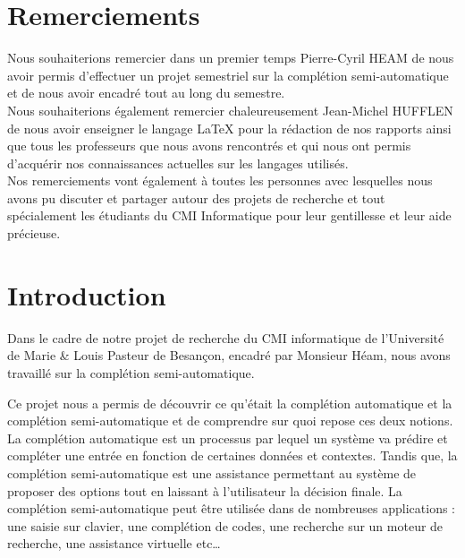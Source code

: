 \documentclass[a4paper, 11pt]{report}
\begin{document}
\chapter*{Remerciements}

Nous souhaiterions remercier dans un premier temps Pierre-Cyril HEAM de nous avoir permis d'effectuer un projet semestriel sur la complétion semi-automatique et de nous avoir encadré tout au long du semestre. \\

Nous souhaiterions également remercier chaleureusement Jean-Michel HUFFLEN de nous avoir enseigner le langage \LaTeX{} pour la rédaction de nos rapports ainsi que tous les professeurs que nous avons rencontrés et qui nous ont permis d'acquérir nos connaissances actuelles sur les langages utilisés.\\

Nos remerciements vont également à toutes les personnes avec lesquelles nous avons pu discuter et partager autour des projets de recherche et tout spécialement les étudiants du CMI Informatique pour leur gentillesse et leur aide précieuse. \\



\newpage
\tableofcontents
\listoffigures



\chapter*{Introduction} %

Dans le cadre de notre projet de recherche du CMI informatique de l’Université de Marie \& Louis Pasteur de Besançon, encadré par Monsieur Héam, nous avons travaillé sur la complétion semi-automatique.\par \vspace{\baselineskip} %


Ce projet nous a permis de découvrir ce qu'était la complétion automatique et la complétion semi-automatique et de comprendre sur quoi repose ces deux notions. La complétion automatique est un processus par lequel un système va prédire et compléter une entrée en fonction de certaines données et contextes. Tandis que, la complétion semi-automatique est une assistance permettant au système de proposer des options tout en laissant à l'utilisateur la décision finale. La complétion semi-automatique peut être utilisée dans de nombreuses applications : une saisie sur clavier, une complétion de codes, une recherche sur un moteur de recherche, une assistance virtuelle etc\dots\par \vspace{\baselineskip} %
\end{document}
